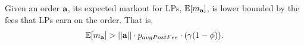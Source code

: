

    \begin{theorem}
        Given an order $\textbf a$, its expected markout for LPs, $\mathbb E[m_{\textbf a}]$, is lower bounded by the fees that LPs earn on the order. That is,
            $$\mathbb E[m_{\textbf a}] > || \textbf a || \cdot p_{avgPostFee} \cdot (\gamma(1-\phi)).$$
    \end{theorem}

